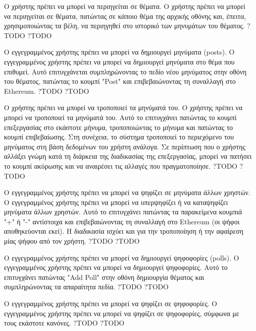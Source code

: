 \begin{enumerate}[label=\textbf{<ΛΑ-\arabic*>}, leftmargin=\parindent, align=left, labelwidth=\parindent, labelsep=0pt]
	\sysReqItem
		{\label{srs:functional-srs-browse-topics}}
		{Ο χρήστης πρέπει να μπορεί να περιηγείται σε θέματα.}
		{Ο χρήστης πρέπει να μπορεί να περιηγείται σε θέματα, πατώντας σε κάποιο θέμα της αρχικής οθόνης και, έπειτα, χρησιμοποιώντας τα βέλη, να περιηγηθεί στο ιστορικό των μηνυμάτων του θέματος.}
		{?}{TODO}
		{?}{TODO}

	\sysReqItem
		{\label{srs:functional-srs-create-post}}
		{Ο εγγεγραμμένος χρήστης πρέπει να μπορεί να δημιουργεί μηνύματα (posts).}
		{Ο εγγεγραμμένος χρήστης πρέπει να μπορεί να δημιουργεί μηνύματα στο θέμα που επιθυμεί. Αυτό επιτυγχάνεται συμπληρώνοντας το πεδίο νέου μηνύματος στην οθόνη του θέματος, πατώντας το κουμπί "Post" και επιβεβαιώνοντας τη συναλλαγή στο Ethereum.}
		{?}{TODO}
		{?}{TODO}

	\sysReqItem
		{\label{srs:functional-srs-modify-post}}
		{Ο χρήστης πρέπει να μπορεί να τροποποιεί τα μηνύματά του.}
		{Ο χρήστης πρέπει να μπορεί να τροποποιεί τα μηνύματά του. Αυτό το επιτυγχάνει πατώντας το κουμπί επεξεργασίας στο εκάστοτε μήνυμα, τροποποιώντας το μήνυμα και πατώντας το κουμπί επιβεβαίωσης. Στη συνέχεια, το σύστημα τροποποιεί το περιεχόμενο του μηνύματος στη βάση δεδομένων του χρήστη ανάλογα. Σε περίπτωση που ο χρήστης αλλάξει γνώμη κατά τη διάρκεια της διαδικασίας της επεξεργασίας, μπορεί να πατήσει το κουμπί ακύρωσης και να αναιρέσει τις αλλαγές που πραγματοποίησε.}
		{?}{TODO}
		{?}{TODO}

	\sysReqItem
		{\label{srs:functional-srs-vote-posts}}
		{Ο εγγεγραμμένος χρήστης πρέπει να μπορεί να ψηφίζει σε μηνύματα άλλων χρηστών.}
		{Ο εγγεγραμμένος χρήστης πρέπει να μπορεί να υπερψηφίζει ή να καταψηφίζει μηνύματα άλλων χρηστών. Αυτό το επιτυγχάνει πατώντας τα παρακείμενα κουμπιά "+" ή "-" αντίστοιχα και επιβεβαιώνοντας τη συναλλαγή στο Ethereum (οι ψήφοι αποθηκεύονται εκεί). Η διαδικασία ισχύει και για την τροποποίηση ή την αφαίρεση μίας ψήφου από τον χρήστη.}
		{?}{TODO}
		{?}{TODO}

	\sysReqItem
		{\label{srs:functional-srs-create-polls}}
		{Ο εγγεγραμμένος χρήστης πρέπει να μπορεί να δημιουργεί ψηφοφορίες (polls).}
		{Ο εγγεγραμμένος χρήστης πρέπει να μπορεί να δημιουργεί ψηφοφορίες. Αυτό το επιτυγχάνει πατώντας "Add Poll" στην οθόνη δημιουργία θέματος και συμπληρώνοντας τα απαραίτητα πεδία.}
		{?}{TODO}
		{?}{TODO}

	\sysReqItem
		{\label{srs:functional-srs-vote-polls}}
		{Ο εγγεγραμμένος χρήστης πρέπει να μπορεί να ψηφίζει σε ψηφοφορίες.}
		{Ο εγγεγραμμένος χρήστης πρέπει να μπορεί να ψηφίζει σε ψηφοφορίες, σύμφωνα με τους εκάστοτε κανόνες.}
		{?}{TODO}
		{?}{TODO}


\end{enumerate}

